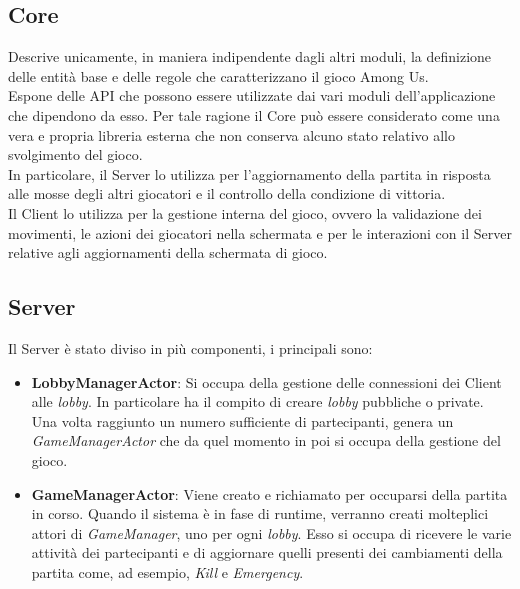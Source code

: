 \subsection{Core}
Descrive unicamente, in maniera indipendente dagli altri moduli, la definizione delle entit\`a base e delle regole che caratterizzano il gioco Among Us.\\
Espone delle API che possono essere utilizzate dai vari moduli dell'applicazione che dipendono da esso. Per tale ragione il Core può essere considerato come una vera e propria libreria esterna che non conserva alcuno stato relativo allo svolgimento del gioco.\\
In particolare, il Server lo utilizza per l'aggiornamento della partita in risposta alle mosse degli altri giocatori e il controllo della condizione di vittoria. \\
Il Client lo utilizza per la gestione interna del gioco, ovvero la validazione dei movimenti, le azioni dei giocatori nella schermata e per le interazioni con il Server relative agli aggiornamenti della schermata di gioco.

\subsection{Server}
Il Server \`e stato diviso in più componenti, i principali sono:
\begin{itemize}
    \item \textbf{LobbyManagerActor}: Si occupa  della gestione delle connessioni dei Client alle \textit{lobby}. In particolare ha il compito di creare \textit{lobby} pubbliche o private. Una volta raggiunto un numero sufficiente di partecipanti, genera un \textit{GameManagerActor} che da quel momento in poi si occupa della gestione del gioco.
    \item \textbf{GameManagerActor}: Viene creato e richiamato per occuparsi della partita in corso. Quando il sistema \`e in fase di runtime, verranno creati molteplici attori di \textit{GameManager}, uno per ogni \textit{lobby}. Esso si occupa di ricevere le varie attivit\`a dei partecipanti e di aggiornare quelli presenti dei cambiamenti della partita come, ad esempio, \textit{Kill} e \textit{Emergency}.
\end{itemize}

